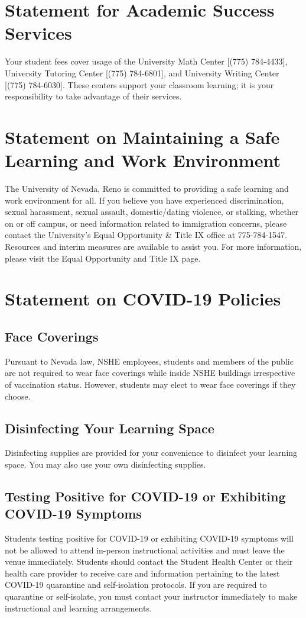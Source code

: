 \documentclass[11pt, a4paper]{article}
\begin{document}
\section*{Statement for Academic Success Services}
Your student fees cover usage of the University Math Center [(775) 784-4433], University Tutoring Center [(775) 784-6801], and University Writing Center [(775) 784-6030]. These centers support your classroom learning; it is your responsibility to take advantage of their services.

\section*{Statement on Maintaining a Safe Learning and Work Environment}
The University of Nevada, Reno is committed to providing a safe learning and work environment for all. If you believe you have experienced discrimination, sexual harassment, sexual assault, domestic/dating violence, or stalking, whether on or off campus, or need information related to immigration concerns, please contact the University’s Equal Opportunity \& Title IX office at 775-784-1547. Resources and interim measures are available to assist you. For more information, please visit the Equal Opportunity and Title IX page.

\section*{Statement on COVID-19 Policies}
\subsection*{Face Coverings}
Pursuant to Nevada law, NSHE employees, students and members of the public are not required to wear face coverings while inside NSHE buildings irrespective of vaccination status. However, students may elect to wear face coverings if they choose.

\subsection*{Disinfecting Your Learning Space}
Disinfecting supplies are provided for your convenience to disinfect your learning space. You may also use your own disinfecting supplies.

\subsection*{Testing Positive for COVID-19 or Exhibiting COVID-19 Symptoms}
Students testing positive for COVID-19 or exhibiting COVID-19 symptoms will not be allowed to attend in-person instructional activities and must leave the venue immediately. Students should contact the Student Health Center or their health care provider to receive care and information pertaining to the latest COVID-19 quarantine and self-isolation protocols. If you are required to quarantine or self-isolate, you must contact your instructor immediately to make instructional and learning arrangements.
\end{document}

